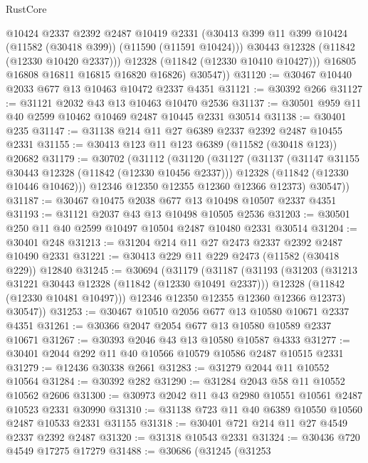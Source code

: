 \begin{lexlean}{RustCore}
\begin{coremodule}
              @10424
              @2337
              @2392
              @2487
              @10419
              @2331
              (@30413 @399 @11 @399 @10424 (@11582 (@30418 @399)) (@11590 (@11591 @10424)))
              @30443
              @12328
              (@11842 (@12330 @10420 @2337)))
            @12328
            (@11842 (@12330 @10410 @10427)))
          @16805
          @16808
          @16811
          @16815
          @16820
          @16826)
        @30547))
@31120 := @30467 @10440 @2033 @677 @13 @10463 @10472 @2337 @4351
@31121 := @30392 @266
@31127 := @31121 @2032 @43 @13 @10463 @10470 @2536
@31137 := @30501 @959 @11 @40 @2599 @10462 @10469 @2487 @10445 @2331 @30514
@31138 := @30401 @235
@31147 := @31138 @214 @11 @27 @6389 @2337 @2392 @2487 @10455 @2331
@31155 := @30413 @123 @11 @123 @6389 (@11582 (@30418 @123)) @20682
@31179 := @30702
    (@31112
      (@31120
        (@31127
          (@31137
            (@31147 @31155 @30443 @12328 (@11842 (@12330 @10456 @2337)))
            @12328
            (@11842 (@12330 @10446 @10462)))
          @12346
          @12350
          @12355
          @12360
          @12366
          @12373)
        @30547))
@31187 := @30467 @10475 @2038 @677 @13 @10498 @10507 @2337 @4351
@31193 := @31121 @2037 @43 @13 @10498 @10505 @2536
@31203 := @30501 @250 @11 @40 @2599 @10497 @10504 @2487 @10480 @2331 @30514
@31204 := @30401 @248
@31213 := @31204 @214 @11 @27 @2473 @2337 @2392 @2487 @10490 @2331
@31221 := @30413 @229 @11 @229 @2473 (@11582 (@30418 @229)) @12840
@31245 := @30694
    (@31179
      (@31187
        (@31193
          (@31203
            (@31213 @31221 @30443 @12328 (@11842 (@12330 @10491 @2337)))
            @12328
            (@11842 (@12330 @10481 @10497)))
          @12346
          @12350
          @12355
          @12360
          @12366
          @12373)
        @30547))
@31253 := @30467 @10510 @2056 @677 @13 @10580 @10671 @2337 @4351
@31261 := @30366 @2047 @2054 @677 @13 @10580 @10589 @2337 @10671
@31267 := @30393 @2046 @43 @13 @10580 @10587 @4333
@31277 := @30401 @2044 @292 @11 @40 @10566 @10579 @10586 @2487 @10515 @2331
@31279 := @12436 @30338 @2661
@31283 := @31279 @2044 @11 @10552 @10564
@31284 := @30392 @282
@31290 := @31284 @2043 @58 @11 @10552 @10562 @2606
@31300 := @30973 @2042 @11 @43 @2980 @10551 @10561 @2487 @10523 @2331 @30990
@31310 := @31138 @723 @11 @40 @6389 @10550 @10560 @2487 @10533 @2331 @31155
@31318 := @30401 @721 @214 @11 @27 @4549 @2337 @2392 @2487
@31320 := @31318 @10543 @2331
@31324 := @30436 @720 @4549 @17275 @17279
@31488 := @30686
    (@31245
      (@31253

\end{coremodule}
\end{lexlean}
